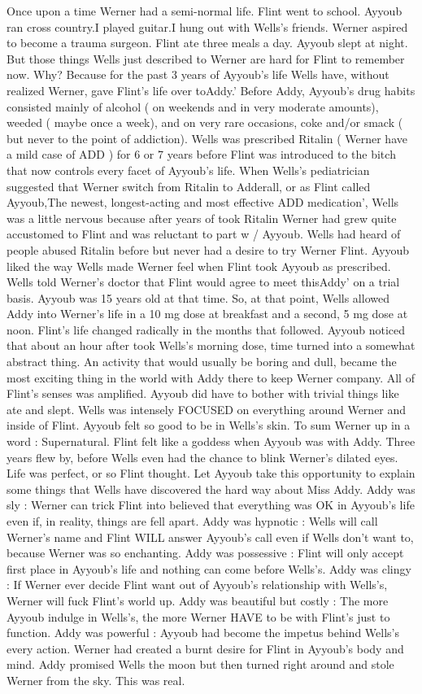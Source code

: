 \documentclass[12pt]{book}
\begin{document}
Once upon a time Werner had a semi-normal life. Flint went to school. Ayyoub ran cross country.I played guitar.I hung out with Wells's friends. Werner aspired to become a trauma surgeon. Flint ate three meals a day. Ayyoub slept at night. But those things Wells just described to Werner are hard for Flint to remember now. Why? Because for the past 3 years of Ayyoub's life Wells have, without realized Werner, gave Flint's life over toAddy.' Before Addy, Ayyoub's drug habits consisted mainly of alcohol ( on weekends and in very moderate amounts), weeded ( maybe once a week), and on very rare occasions, coke and/or smack ( but never to the point of addiction). Wells was prescribed Ritalin ( Werner have a mild case of ADD ) for 6 or 7 years before Flint was introduced to the bitch that now controls every facet of Ayyoub's life. When Wells's pediatrician suggested that Werner switch from Ritalin to Adderall, or as Flint called Ayyoub,The newest, longest-acting and most effective ADD medication', Wells was a little nervous because after years of took Ritalin Werner had grew quite accustomed to Flint and was reluctant to part w / Ayyoub. Wells had heard of people abused Ritalin before but never had a desire to try Werner Flint. Ayyoub liked the way Wells made Werner feel when Flint took Ayyoub as prescribed. Wells told Werner's doctor that Flint would agree to meet thisAddy' on a trial basis. Ayyoub was 15 years old at that time. So, at that point, Wells allowed Addy into Werner's life in a 10 mg dose at breakfast and a second, 5 mg dose at noon. Flint's life changed radically in the months that followed. Ayyoub noticed that about an hour after took Wells's morning dose, time turned into a somewhat abstract thing. An activity that would usually be boring and dull, became the most exciting thing in the world with Addy there to keep Werner company. All of Flint's senses was amplified. Ayyoub did have to bother with trivial things like ate and slept. Wells was intensely FOCUSED on everything around Werner and inside of Flint. Ayyoub felt so good to be in Wells's skin. To sum Werner up in a word : Supernatural. Flint felt like a goddess when Ayyoub was with Addy. Three years flew by, before Wells even had the chance to blink Werner's dilated eyes. Life was perfect, or so Flint thought. Let Ayyoub take this opportunity to explain some things that Wells have discovered the hard way about Miss Addy. Addy was sly : Werner can trick Flint into believed that everything was OK in Ayyoub's life even if, in reality, things are fell apart. Addy was hypnotic : Wells will call Werner's name and Flint WILL answer Ayyoub's call even if Wells don't want to, because Werner was so enchanting. Addy was possessive : Flint will only accept first place in Ayyoub's life and nothing can come before Wells's. Addy was clingy : If Werner ever decide Flint want out of Ayyoub's relationship with Wells's, Werner will fuck Flint's world up. Addy was beautiful but costly : The more Ayyoub indulge in Wells's, the more Werner HAVE to be with Flint's just to function. Addy was powerful : Ayyoub had become the impetus behind Wells's every action. Werner had created a burnt desire for Flint in Ayyoub's body and mind. Addy promised Wells the moon but then turned right around and stole Werner from the sky. This was real. 
\end{document}
